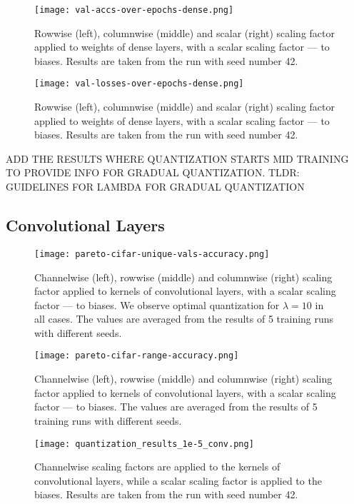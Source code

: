 \begin{figure}[h!]
  \centering
  \texttt{[image: val-accs-over-epochs-dense.png]}
  \caption{Rowwise (left), columnwise (middle) and scalar (right) scaling factor applied to weights of dense layers, with a scalar scaling factor — to biases. Results are taken from the run with seed number 42.}
  \label{fig:val-accs-over-epochs-dense}
\end{figure}

\begin{figure}[h!]
  \centering
  \texttt{[image: val-losses-over-epochs-dense.png]}
  \caption{Rowwise (left), columnwise (middle) and scalar (right) scaling factor applied to weights of dense layers, with a scalar scaling factor — to biases. Results are taken from the run with seed number 42.}
  \label{fig:val-losses-over-epochs-dense}
\end{figure}
  
ADD THE RESULTS WHERE QUANTIZATION STARTS MID TRAINING
TO PROVIDE INFO FOR GRADUAL QUANTIZATION. TLDR: GUIDELINES FOR LAMBDA FOR GRADUAL 
QUANTIZATION

\subsection{Convolutional Layers}
\label{subsec:convolutionallayers}

\begin{figure}[h!]
  \centering
  \texttt{[image: pareto-cifar-unique-vals-accuracy.png]}
  \caption{Channelwise (left), rowwise (middle) and columnwise (right) scaling factor applied to kernels of convolutional layers, with a scalar scaling factor — to biases.
  We observe optimal quantization for \( \lambda = 10\)  in all cases. The values are averaged from the results of 5 training runs with different seeds.}
  \label{fig:pareto-mnist-unique-vals-accuracy}
\end{figure}

\begin{figure}[h!]
  \centering
  \texttt{[image: pareto-cifar-range-accuracy.png]}
  \caption{Channelwise (left), rowwise (middle) and columnwise (right) scaling factor applied to kernels of convolutional layers, with a scalar scaling factor — to biases.  The values are averaged from the results of 5 training runs with different seeds.}
  \label{fig:pareto-mnist-range-accuracy}
\end{figure}

\begin{figure}[h!]
  \centering
  \texttt{[image: quantization\_results\_1e-5\_conv.png]}
  \caption{Channelwise scaling factors are applied to the kernels of convolutional layers, while a scalar scaling factor is applied to the biases. Results are taken from the run with seed number 42.}
  \label{fig:quantization_results_1e-10_dense}
\end{figure}

